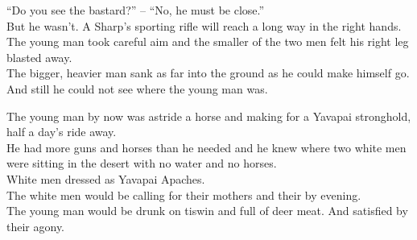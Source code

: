 ``Do you see the bastard?'' -- ``No, he must be close.'' \\

But he wasn't. A Sharp's sporting rifle will reach a long way in the right hands. \\
The young man took careful aim and the smaller of the two men felt his right leg blasted away. \\
The bigger, heavier man sank as far into the ground as he could make himself go. \\
And still he could not see where the young man was. \\




The young man by now was astride a horse and making for a Yavapai stronghold, half a day's ride away. \\
He had more guns and horses than he needed and he knew where two white men were sitting in the desert with no water and no horses. \\
White men dressed as Yavapai Apaches. \\

The white men would be calling for their mothers and their  by evening. \\
The young man would be drunk on tiswin and full of deer meat. And satisfied by their agony. \\

